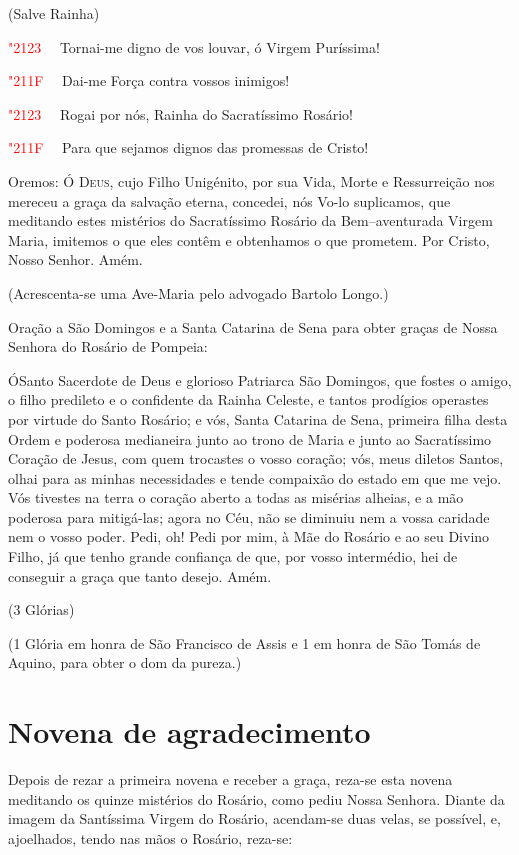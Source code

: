 \documentclass[10pt,twoside,a5paper]{article}
\newcommand{\versic}[1]{
	\textcolor{red}{\char"2123\ }#1
}
\newcommand{\response}[1]{
	\textcolor{red}{\char"211F\ }#1
}
\begin{document}
	(Salve Rainha)
	
	\versic\ Tornai-me digno de vos louvar, ó Virgem Puríssima!
	
	\response\ Dai-me Força contra vossos inimigos!
	
	\versic\ Rogai por nós, Rainha do Sacratíssimo Rosário!
	
	\response\ Para que sejamos dignos das promessas de Cristo!
	
	Oremos:
	\lettrine{Ó}{ Deus}, cujo Filho Unigénito, por sua Vida, Morte e Ressurreição nos mereceu a graça da salvação eterna, concedei, nós Vo-lo suplicamos, que meditando estes mistérios do Sacratíssimo Rosário da Bem–aventurada Virgem Maria, imitemos o que eles contêm e obtenhamos o que prometem. Por Cristo, Nosso Senhor. Amém.
	
	(Acrescenta-se uma Ave-Maria pelo advogado Bartolo Longo.)
	
	Oração a São Domingos e a Santa Catarina de Sena para obter graças de Nossa Senhora do Rosário de Pompeia:
	
	\lettrine{Ó} Santo Sacerdote de Deus e glorioso Patriarca São Domingos, que fostes o amigo, o filho predileto e o confidente da Rainha Celeste, e tantos prodígios operastes por virtude do Santo Rosário; e vós, Santa Catarina de Sena, primeira filha desta Ordem e poderosa medianeira junto ao trono de Maria e junto ao Sacratíssimo Coração de Jesus, com quem trocastes o vosso coração; vós, meus diletos Santos, olhai para as minhas necessidades e tende compaixão do estado em que me vejo. Vós tivestes na terra o coração aberto a todas as misérias alheias, e a mão poderosa para mitigá-las; agora no Céu, não se diminuiu nem a vossa caridade nem o vosso poder. Pedi, oh! Pedi por mim, à Mãe do Rosário e ao seu Divino Filho, já que tenho grande confiança de que, por vosso intermédio, hei de conseguir a graça que tanto desejo. Amém.
	
	(3 Glórias)
	
	(1 Glória em honra de São Francisco de Assis e 1 em honra de São Tomás de Aquino, para obter o dom da pureza.)
	
	\section*{Novena de agradecimento}
	
	Depois de rezar a primeira novena e receber a graça, reza-se esta novena meditando os quinze mistérios do Rosário, como pediu Nossa Senhora. Diante da imagem da Santíssima Virgem do Rosário, acendam-se duas velas, se possível, e, ajoelhados, tendo nas mãos o Rosário, reza-se:
	
\end{document}
